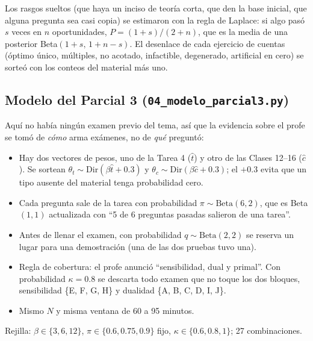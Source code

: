 \documentclass[11pt]{article}
\newcommand{\cod}[1]{\texttt{#1}}
\begin{document}
Los rasgos sueltos (que haya un inciso de teoría corta, que den la base inicial, que alguna
pregunta sea casi copia) se estimaron con la regla de Laplace: si algo pasó $s$ veces en $n$
oportunidades, $P=(1+s)/(2+n)$, que es la media de una posterior Beta$(1+s,\,1+n-s)$. El
desenlace de cada ejercicio de cuentas (óptimo único, múltiples, no acotado, infactible,
degenerado, artificial en cero) se sorteó con los conteos del material más uno.

\subsection{Modelo del Parcial 3 (\cod{04\_modelo\_parcial3.py})}
Aquí no había ningún examen previo del tema, así que la evidencia sobre el profe se tomó de
\emph{cómo} arma exámenes, no de \emph{qué} preguntó:
\begin{itemize}
\item Hay dos vectores de pesos, uno de la Tarea 4 ($\hat t$) y otro de las Clases 12--16
($\hat c$). Se sortean $\theta_t\sim\text{Dir}(\beta\hat t+0.3)$ y
$\theta_c\sim\text{Dir}(\beta\hat c+0.3)$; el $+0.3$ evita que un tipo ausente del material
tenga probabilidad cero.
\item Cada pregunta sale de la tarea con probabilidad $\pi\sim\text{Beta}(6,2)$, que es
Beta$(1,1)$ actualizada con ``5 de 6 preguntas pasadas salieron de una tarea''.
\item Antes de llenar el examen, con probabilidad $q\sim\text{Beta}(2,2)$ se reserva un lugar
para una demostración (una de las dos pruebas tuvo una).
\item Regla de cobertura: el profe anunció ``sensibilidad, dual y primal''. Con probabilidad
$\kappa=0.8$ se descarta todo examen que no toque los dos bloques, sensibilidad
\{E, F, G, H\} y dualidad \{A, B, C, D, I, J\}.
\item Mismo $N$ y misma ventana de 60 a 95 minutos.
\end{itemize}
Rejilla: $\beta\in\{3,6,12\}$, $\pi\in\{0.6,0.75,0.9\}$ fijo, $\kappa\in\{0.6,0.8,1\}$; 27
combinaciones.
\end{document}
